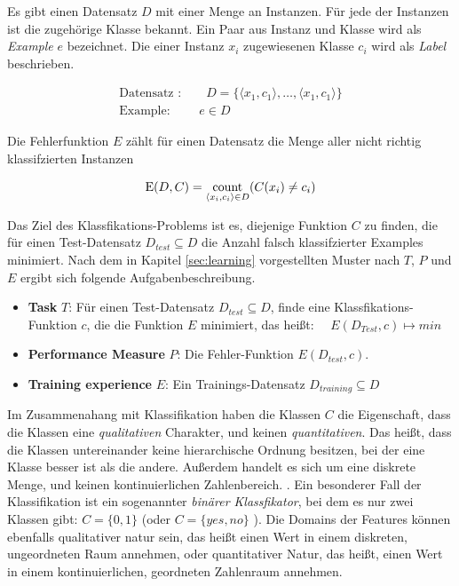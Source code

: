 Es gibt einen Datensatz $D$ mit einer Menge an Instanzen. Für jede der Instanzen ist die zugehörige Klasse bekannt. Ein Paar aus Instanz und Klasse wird als \emph{Example} $e$ bezeichnet. Die einer Instanz $x_i$ zugewiesenen Klasse $c_i$ wird als \emph{Label} beschrieben.
 
\begin{equation}
\begin{gathered}
\text{Datensatz :} \qquad D = \{ \langle x_1, c_1 \rangle, \ldots , \langle x_1, c_1 \rangle  \} \\
\text{Example: } \qquad  e \in D
\end{gathered}
\end{equation}

Die Fehlerfunktion $E$ zählt für einen Datensatz die Menge aller nicht richtig klassifzierten Instanzen

\begin{equation}
\text{E}(D,C) = \operatorname*{count}_{\langle x_i, c_i \rangle \in D} (C(x_i) \neq c_i)
\end{equation}

Das Ziel des Klassfikations-Problems ist es, diejenige Funktion $C$ zu finden, die für einen Test-Datensatz $D_{test} \subseteq D$ die Anzahl falsch klassifzierter Examples minimiert. Nach dem in Kapitel \ref{sec:learning} vorgestellten Muster nach $T$, $P$ und $E$ ergibt sich folgende Aufgabenbeschreibung. \cite[S. 8 - 9]{learning_cart_dobra} \cite[S. 14]{cart_loh} \cite[S. 7 - 10, 18]{machine_marsland}

\begin{itemize}
	\item \textbf{Task} $T$: Für einen Test-Datensatz $D_{test} \subseteq D$, finde eine Klassfikations-Funktion $c$, die die Funktion $E$ minimiert, das heißt: $\quad E(D_{Test}, c) \mapsto min$
	\item \textbf{Performance Measure} $P$: Die Fehler-Funktion $E(D_{test}, c)$.
	\item \textbf{Training experience} $E$: Ein Trainings-Datensatz $D_{training} \subseteq D$ 
\end{itemize}

Im Zusammenahang mit Klassifikation haben die Klassen $C$ die Eigenschaft, dass die Klassen eine \emph{qualitativen} Charakter, und keinen \emph{quantitativen}. Das heißt, dass die Klassen untereinander keine hierarchische Ordnung besitzen, bei der eine Klasse \glqq besser ist als die andere\grqq{}. Außerdem handelt es sich um eine diskrete Menge, und keinen kontinuierlichen Zahlenbereich. \cite[S. 127]{statistical_learning}. Ein besonderer Fall der Klassifikation ist ein sogenannter \emph{binärer Klassfikator}, bei dem es nur zwei Klassen gibt: $C = \{0, 1\}$ (oder $C = \{yes, no\}$ ). %
Die Domains der Features können ebenfalls qualitativer natur sein, das heißt einen Wert in einem diskreten, ungeordneten Raum annehmen, oder  quantitativer Natur, das heißt, einen Wert in einem kontinuierlichen, geordneten Zahlenraum annehmen. \cite[S. 54]{machine_mitchell}

